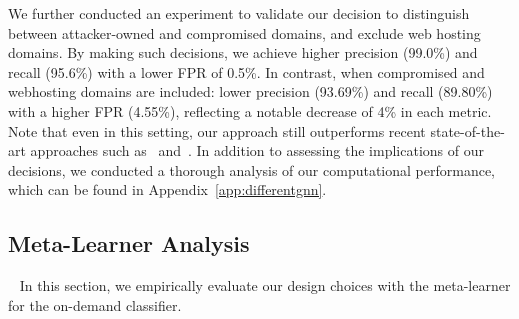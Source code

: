 {We further conducted an experiment to validate our decision to distinguish between attacker-owned and compromised domains, and exclude web hosting domains.
By making such decisions, we achieve higher precision (99.0\%) and recall (95.6\%) with a lower FPR of 0.5\%. In contrast, when compromised and webhosting domains are included: lower precision (93.69\%) and recall (89.80\%) with a higher FPR (4.55\%), reflecting a notable decrease of 4\% in each metric. 
Note that even in this setting, our approach still outperforms recent state-of-the-art approaches such as~\cite{BPPhishingCCS:2022} and~\cite{practicalattacks:SP:2024}.
In addition to assessing the implications of our decisions, we conducted a thorough analysis of our computational performance, which can be found in Appendix~\ref{app:differentgnn}.
}



\subsection{Meta-Learner Analysis}~\label{ss:metaanalysis}
In this section, we empirically evaluate our design choices with the meta-learner for the on-demand classifier.


\begin{table}[!ht]
\centering
\caption{On-demand classifier testing results. }
\footnotesize
\label{tab:results_baseline_meta}
\label{tab:dataset_real}
\end{table}

